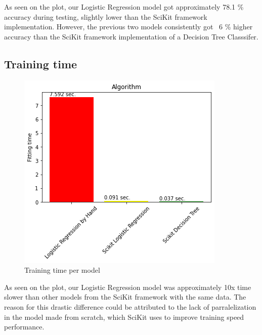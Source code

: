 \documentclass[letterpaper, 10 pt, conference]{ieeeconf}
\begin{document}
As seen on the plot, our Logistic Regression model got approximately 78.1 \% accuracy during testing, slightly lower than the SciKit framework
implementation. However, the previous two models consistently got ~6 \% higher accuracy than the SciKit framework implementation of a Decision Tree Classsifer. \\

\subsection{Training time}
\begin{figure}[thpb]
    \centering
    \includegraphics[scale=0.5]{figures/training_time.png}
    \caption{Training time per model}
    \label{training_time}
 \end{figure}

 As seen on the plot, our Logistic Regression model was approximately 10x time slower than other models from the SciKit framework with the same data.
 The reason for this drastic difference could be attributed to the lack of parralelization in the model made from scratch, which SciKit
 uses to improve training speed performance.
\end{document}
